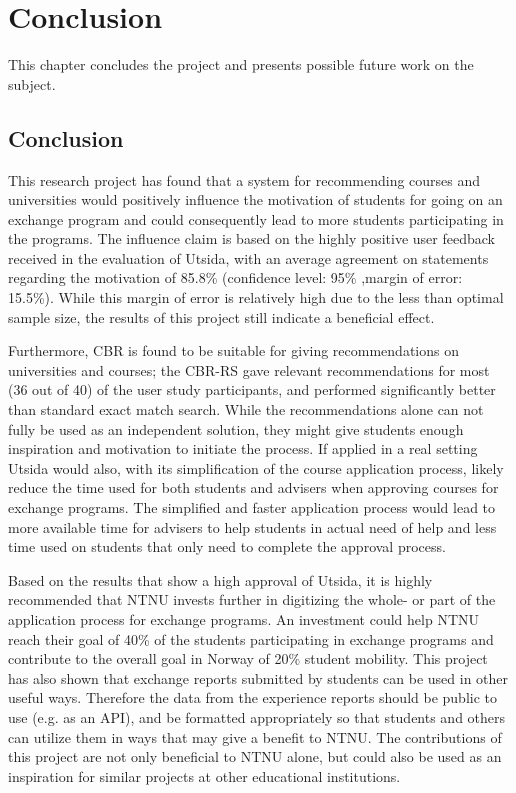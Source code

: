 \chapter{Conclusion}
This chapter concludes the project and presents possible future work on the subject. 

\section{Conclusion}
This research project has found that a system for recommending courses and universities would positively influence the motivation of students for going on an exchange program and could consequently lead to more students participating in the programs. The influence claim is based on the highly positive user feedback received in the evaluation of Utsida, with an average agreement on statements regarding the motivation of 85.8\% (confidence level: 95\% ,margin of error: 15.5\%). While this margin of error is relatively high due to the less than optimal sample size, the results of this project still indicate a beneficial effect.

Furthermore, CBR is found to be suitable for giving recommendations on universities and courses; the CBR-RS gave relevant recommendations for most (36 out of 40) of the user study participants, and performed significantly better than standard exact match search. While the recommendations alone can not fully be used as an independent solution, they might give students enough inspiration and motivation to initiate the process. If applied in a real setting Utsida would also, with its simplification of the course application process, likely reduce the time used for both students and advisers when approving courses for exchange programs. The simplified and faster application process would lead to more available time for advisers to help students in actual need of help and less time used on students that only need to complete the approval process.

Based on the results that show a high approval of Utsida, it is highly recommended that NTNU invests further in digitizing the whole- or part of the application process for exchange programs. An investment could help NTNU reach their goal of 40\% of the students participating in exchange programs and contribute to the overall goal in Norway of 20\% student mobility. This project has also shown that exchange reports submitted by students can be used in other useful ways. Therefore the data from the experience reports should be public to use (e.g. as an API), and be formatted appropriately so that students and others can utilize them in ways that may give a benefit to NTNU. The contributions of this project are not only beneficial to NTNU alone, but could also be used as an inspiration for similar projects at other educational institutions.     


